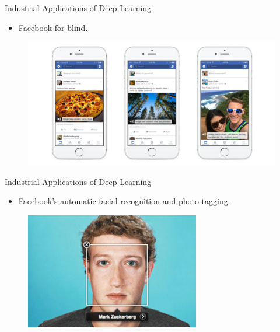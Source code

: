 \documentclass[10pt]{beamer}
\begin{document}
	\begin{frame}[t]{Industrial Applications of Deep Learning}
		\begin{itemize}
			\item \large{Facebook for blind.}
		\end{itemize}
		\begin{figure}
			\includegraphics[width=\linewidth]{images/fb_blind}
		\end{figure}
	\end{frame}
	\begin{frame}[t]{Industrial Applications of Deep Learning}
		\begin{itemize}
			\item \large{Facebook's automatic facial recognition and photo-tagging.}
		\end{itemize}
		\begin{figure}
			\includegraphics[width=3in,height=2in]{images/mark}
		\end{figure}
	\end{frame}
\end{document}
